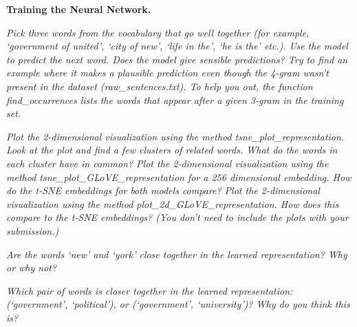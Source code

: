 \documentclass{myhw}
\begin{document}
\begin{homeworkProblem}
\textbf{Training the Neural Network.}
\begin{homeworkSection}
\emph{Pick three words from the vocabulary that go well together (for example, ‘government of united’, ‘city of new’, ‘life in the’, ‘he is the’ etc.). Use the model to predict the next word. Does the model give sensible predictions? Try to find an example where it makes a plausible prediction even though the 4-gram wasn’t present in the dataset (raw\_sentences.txt). To help you out, the function find\_occurrences lists the words that appear after a given 3-gram in the training set.}
\end{homeworkSection}
\begin{homeworkSection}
\emph{Plot the 2-dimensional visualization using the method tsne\_plot\_representation. Look at the plot and find a few clusters of related words. What do the words in each cluster have in common? Plot the 2-dimensional visualization using the method tsne\_plot\_GLoVE\_representation for a 256 dimensional embedding. How do the t-SNE embeddings for both models compare? Plot the 2-dimensional visualization using the method plot\_2d\_GLoVE\_representation. How does this compare to the t-SNE embeddings? (You don’t need to include the plots with your submission.)}
\end{homeworkSection}
\begin{homeworkSection}
\emph{Are the words ‘new’ and ‘york’ close together in the learned representation? Why or why not?}
\end{homeworkSection}
\begin{homeworkSection}
\emph{Which pair of words is closer together in the learned representation: (‘government’, ‘political’), or (‘government’, ‘university’)? Why do you think this is?}
\end{homeworkSection}
\end{homeworkProblem}
\end{document}

